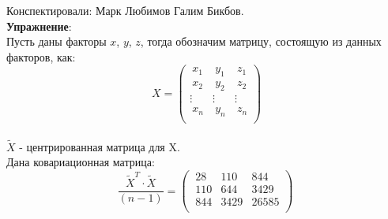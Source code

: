 \documentclass[12pt]{article} %
\theoremstyle{definition} %
\begin{document}
Конспектировали: Марк Любимов Галим Бикбов.\\

\textbf{Упражнение}:\\
Пусть даны факторы $x$, $y$, $z$, тогда обозначим матрицу, состоящую из данных факторов, как:
\[
\ X = \begin{pmatrix}
           \ x_{1} & \ y_{1} &\ z_{1}\\
           \ x_{2} & \ y_{2} &\ z_{2}\\
           \vdots & \vdots &  \vdots\\
           \ x_{n} & \ y_{n} &\ z_{n}\\
         \end{pmatrix}
         \]\\
$\widetilde{X}$ - центрированная матрица для X.\\
Дана ковариационная матрица:
\[\frac{\widetilde{X}^T\cdot\widetilde{X}}{(n-1)} = \begin{pmatrix}
            \ 28 & 110 & 844\\
            \ 110 & 644 & 3429 \\ 
            \ 844 & 3429 & 26585\\
        \end{pmatrix}
\]
\end{document}
